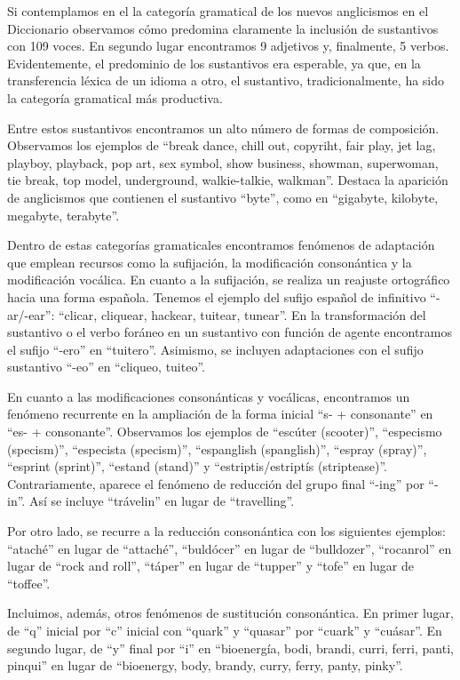 \documentclass{textolivre}
\begin{document}
Si contemplamos en el  la categoría gramatical de los nuevos anglicismos en el Diccionario observamos cómo predomina claramente la inclusión de sustantivos con 109 voces. En segundo lugar encontramos 9 adjetivos y, finalmente, 5 verbos. Evidentemente, el predominio de los sustantivos era esperable, ya que, en la transferencia léxica de un idioma a otro, el sustantivo, tradicionalmente, ha sido la categoría gramatical más productiva.

Entre estos sustantivos encontramos un alto número de formas de composición. Observamos los ejemplos de “break dance, chill out, copyriht, fair play, jet lag, playboy, playback, pop art, sex symbol, show business, showman, superwoman, tie break, top model, underground, walkie-talkie, walkman”. Destaca la aparición de anglicismos que contienen el sustantivo “byte”, como en “gigabyte, kilobyte, megabyte, terabyte”.

Dentro de estas categorías gramaticales encontramos fenómenos de adaptación que emplean recursos como la sufijación, la modificación consonántica y la modificación vocálica. En cuanto a la sufijación, se realiza un reajuste ortográfico hacia una forma española. Tenemos el ejemplo del sufijo español de infinitivo “-ar/-ear”: “clicar, cliquear, hackear, tuitear, tunear”. En la transformación del sustantivo o el verbo foráneo en un sustantivo con función de agente encontramos el sufijo “-ero” en “tuitero”. Asimismo, se incluyen adaptaciones con el sufijo sustantivo “-eo” en “cliqueo, tuiteo”.

En cuanto a las modificaciones consonánticas y vocálicas, encontramos un fenómeno recurrente en la ampliación de la forma inicial “s- + consonante” en “es- + consonante”. Observamos los ejemplos de “escúter (scooter)”, “especismo (specism)”, “especista (specism)”, “espanglish (spanglish)”, “espray (spray)”, “esprint (sprint)”, “estand (stand)” y “estriptis/estriptís (striptease)”. Contrariamente, aparece el fenómeno de reducción del grupo final “-ing” por “-in”. Así se incluye “trávelin” en lugar de “travelling”.

Por otro lado, se recurre a la reducción consonántica con los siguientes ejemplos: “ataché” en lugar de “attaché”, “buldócer” en lugar de “bulldozer”, “rocanrol” en lugar de “rock and roll”, “táper” en lugar de “tupper” y “tofe” en lugar de “toffee”.

Incluimos, además, otros fenómenos de sustitución consonántica. En primer lugar, de “q” inicial por “c” inicial con “quark” y “quasar” por “cuark” y “cuásar”. En segundo lugar, de “y” final por “i” en “bioenergía, bodi, brandi, curri, ferri, panti, pinqui” en lugar de “bioenergy, body, brandy, curry, ferry, panty, pinky”.
\end{document}

